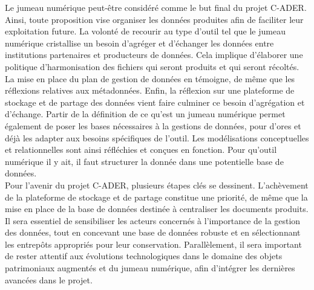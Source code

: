 \documentclass[a4paper,12pt,twoside]{book}
\newcommand{\clearemptydoublepage}{\newpage{\pagestyle{empty}\cleardoublepage}}
\begin{document}
Le jumeau numérique peut-être considéré comme le but final du projet C-ADER. Ainsi, toute proposition vise organiser les données produites afin de faciliter leur exploitation future. La volonté de recourir au type d'outil tel que le jumeau numérique cristallise un besoin d'agréger et d'échanger les données entre institutions partenaires et producteurs de données. Cela implique d'élaborer une politique d'harmonisation des fichiers qui seront produits et qui seront récoltés. La mise en place du plan de gestion de données en témoigne, de même que les réflexions relatives aux métadonnées. Enfin, la réflexion sur une plateforme de stockage et de partage des données vient faire culminer ce besoin d'agrégation et d'échange. Partir de la définition de ce qu'est un jumeau numérique permet également de poser les bases nécessaires à la gestions de données, pour d'ores et déjà les adapter aux besoins spécifiques de l'outil. Les modélisations conceptuelles et relationnelles sont ainsi réfléchies et conçues en fonction. Pour qu'outil numérique il y ait, il faut structurer la donnée dans une potentielle base de données.\\

Pour l'avenir du projet C-ADER, plusieurs étapes clés se dessinent. L'achèvement de la plateforme de stockage et de partage constitue une priorité, de même que la mise en place de la base de données destinée à centraliser les documents produits. Il sera essentiel de sensibiliser les acteurs concernés à l'importance de la gestion des données, tout en concevant une base de données robuste et en sélectionnant les entrepôts appropriés pour leur conservation. Parallèlement, il sera important de rester attentif aux évolutions technologiques dans le domaine des objets patrimoniaux augmentés et du jumeau numérique, afin d’intégrer les dernières avancées dans le projet.

\clearemptydoublepage

\appendix %

\backmatter %

\clearemptydoublepage 
\printglossary
\clearemptydoublepage 
\listoffigures


\clearemptydoublepage
\tableofcontents
\end{document}
